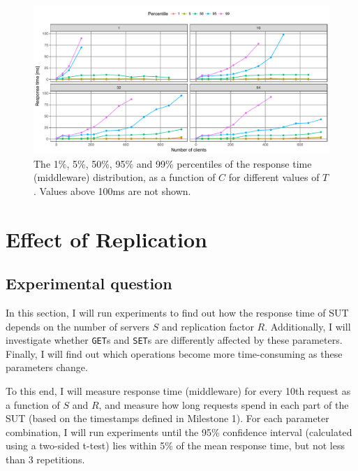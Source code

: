 \documentclass[11pt]{article}
\newcommand{\get}[0]{\texttt{GET}}
\newcommand{\set}[0]{\texttt{SET}}
\begin{document}
\begin{figure}[p]
\centering
\includegraphics[width=\textwidth]{../results/throughput/graphs/response_time_vs_clients.pdf}
\caption{The 1\%, 5\%, 50\%, 95\% and 99\% percentiles of the response time (middleware) distribution, as a function of $C$ for different values of $T$. Values above 100ms are not shown.}
\label{fig:exp1:res:responsetime}
\end{figure}



\clearpage
\section{Effect of Replication}
\label{sec:exp2}

\subsection{Experimental question}

In this section, I will run experiments to find out how the response time of SUT depends on the number of servers $S$ and replication factor $R$. Additionally, I will investigate whether \get{}s and \set{}s are differently affected by these parameters. Finally, I will find out which operations become more time-consuming as these parameters change.

To this end, I will measure response time (middleware) for every 10th request as a function of $S$ and $R$, and measure how long requests spend in each part of the SUT (based on the timestamps defined in Milestone 1). For each parameter combination, I will run experiments until the 95\% confidence interval (calculated using a two-sided t-test) lies within 5\% of the mean response time, but not less than 3 repetitions.
\end{document}
